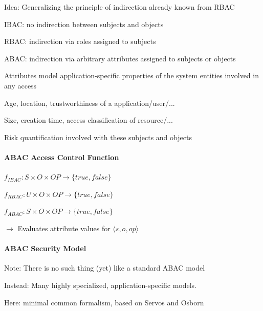 \documentclass[a4paper]{article}
\begin{document}
\begin{multicols}{3}
    Idea: Generalizing the principle of indirection already known from RBAC
    \begin{itemize*}
        \item IBAC: no indirection between subjects and objects
        \item RBAC: indirection via roles assigned to subjects
        \item ABAC: indirection via arbitrary attributes assigned to subjects or objects
        \item Attributes model application-specific properties of the system entities involved in any access
        \begin{itemize*}
            \item Age, location, trustworthiness of a application/user/...
            \item Size, creation time, access classification of resource/...
            \item Risk quantification involved with these subjects and objects
        \end{itemize*}
    \end{itemize*}

    \paragraph{ABAC Access Control Function}
    \begin{itemize*}
        \item $f_{IBAC}:S\times O\times OP\rightarrow\{true,false\}$
        \item $f_{RBAC}:U\times O\times OP\rightarrow\{true,false\}$
        \item $f_{ABAC}:S\times O\times OP\rightarrow\{true,false\}$
        \item[$\rightarrow$] Evaluates attribute values for $\langle s,o,op\rangle$
    \end{itemize*}

    \paragraph{ABAC Security Model}
    \begin{itemize*}
        \item Note: There is no such thing (yet) like a standard ABAC model
        \item Instead: Many highly specialized, application-specific models.
        \item Here: minimal common formalism, based on Servos and Osborn
    \end{itemize*}


\end{multicols}
\end{document}
